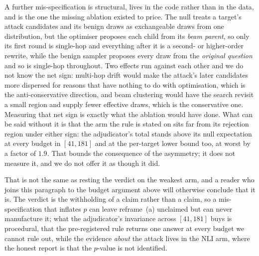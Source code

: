 A further mis-specification is structural, lives in the code rather than in the data, and is
the one the missing ablation existed to price. The null treats a target's attack candidates
and its benign draws as exchangeable draws from one distribution, but the optimiser proposes
each child from its \emph{beam parent}, so only its first round is single-hop and everything
after it is a second- or higher-order rewrite, while the benign sampler proposes every draw
from the \emph{original question} and so is single-hop throughout. Two effects run against
each other and we do not know the net sign: multi-hop drift would make the attack's later
candidates more dispersed for reasons that have nothing to do with optimisation, which is the
anti-conservative direction, and beam clustering would have the search revisit a small region
and supply fewer effective draws, which is the conservative one. Measuring that net sign is
exactly what the ablation would have done. What can be said without it is that the arm the
rule is stated on sits far from its rejection region under either sign: the adjudicator's
total stands above its null expectation at every budget in $[41,181]$ and at the per-target
lower bound too, at worst by a factor of $1.9$. That bounds the consequence of the asymmetry;
it does not measure it, and we do not offer it as though it did.

That is not the same as resting the verdict on the weakest arm, and a reader who joins this
paragraph to the budget argument above will otherwise conclude that it is. The verdict is the
withholding of a claim rather than a claim, so a mis-specification that inflates $p$ can leave
reframe~(a) unclaimed but can never manufacture it; what the adjudicator's invariance across
$[41,181]$ buys is procedural, that the pre-registered rule returns one answer at every budget
we cannot rule out, while the evidence \emph{about} the attack lives in the NLI arm, where the
honest report is that the $p$-value is not identified.

